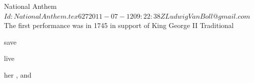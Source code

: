 \begin{SBSong}{National Anthem}
  {$Id: NationalAnthem.tex 627 2011-07-12 09:22:38Z LudwigVanBoll@gmail.com $}
  {The first performance was in 1745 in support of King George II}
  {Traditional}
  \begin{SBVerse*}
     save   

     live   

       

     her ,  and 

         
    
       
  \end{SBVerse*}
\end{SBSong}

